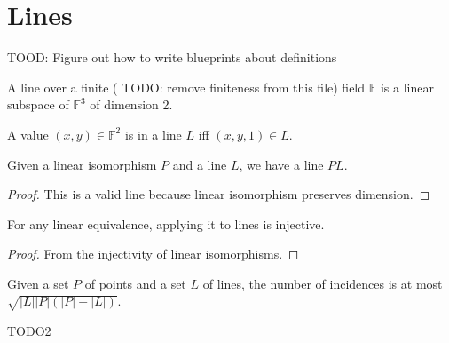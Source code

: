 \chapter{Lines}
\label{chap:line}

TOOD: Figure out how to write blueprints about definitions

\begin{definition}
    \label{Line}
    \leanok
    A line over a finite ({\color{red} TODO: remove finiteness from this file}) field $\mathbb{F}$ is a
    linear subspace of $\mathbb{F}^3$ of dimension 2.
\end{definition}

\begin{definition}
    \label{Line_mem}
    \leanok
    A value $(x, y) \in \mathbb{F}^2$ is in a line $L$ iff $(x, y, 1) \in L$.
\end{definition}

\begin{definition}
    \label{line_apply}
    \leanok
    Given a linear isomorphism $P$ and a line $L$, we have a line $PL$.
\end{definition}

\begin{proof}
    \leanok
    This is a valid line because linear isomorphism preserves dimension.
\end{proof}

\begin{lemma}
    \label{apply_injective}
    \leanok
    For any linear equivalence, applying it to lines is injective.
\end{lemma}

\begin{proof}
    \leanok
    From the injectivity of linear isomorphisms.
\end{proof}

\begin{theorem}
    \label{CS_UB}
    \leanok
    Given a set $P$ of points and a set $L$ of lines, the number of incidences is at most
    $\sqrt{|L| |P| (|P| + |L|)}$.
\end{theorem}

TODO2